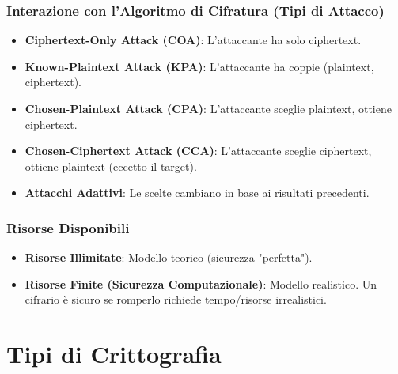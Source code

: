 \documentclass{article}
\begin{document}
\subsubsection{Interazione con l'Algoritmo di Cifratura (Tipi di Attacco)}
\begin{itemize}
    \item \textbf{Ciphertext-Only Attack (COA)}: L'attaccante ha solo ciphertext.
    \item \textbf{Known-Plaintext Attack (KPA)}: L'attaccante ha coppie (plaintext, ciphertext).
    \item \textbf{Chosen-Plaintext Attack (CPA)}: L'attaccante sceglie plaintext, ottiene ciphertext.
    \item \textbf{Chosen-Ciphertext Attack (CCA)}: L'attaccante sceglie ciphertext, ottiene plaintext (eccetto il target).
    \item \textbf{Attacchi Adattivi}: Le scelte cambiano in base ai risultati precedenti.
\end{itemize}

\subsubsection{Risorse Disponibili}
\begin{itemize}
    \item \textbf{Risorse Illimitate}: Modello teorico (sicurezza "perfetta").
    \item \textbf{Risorse Finite (Sicurezza Computazionale)}: Modello realistico. Un cifrario è sicuro se romperlo richiede tempo/risorse irrealistici.
\end{itemize}

\section{Tipi di Crittografia}
\end{document}
